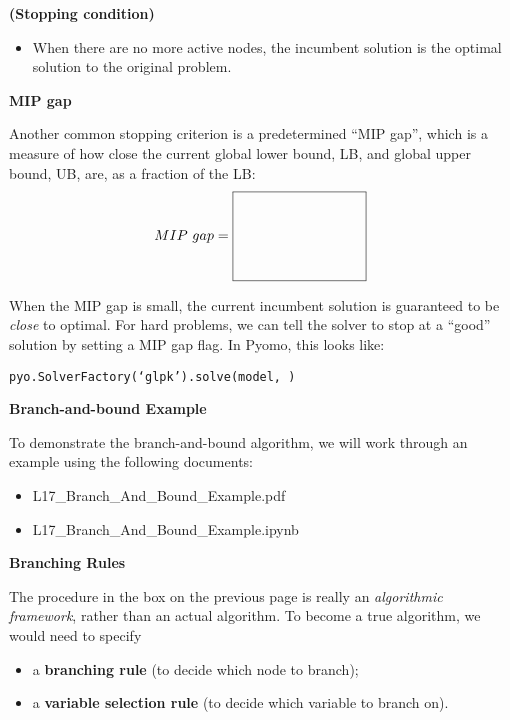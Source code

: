 \documentclass[11pt]{article}
\theoremstyle{definition}
\newcommand{\answerbox}[3]{%
  \fbox{%
    \begin{minipage}[#1]{#2}
      \hfill\vspace{#3}
    \end{minipage}
  }
}
\newcommand{\wordbox}{\answerbox{c}{1.2in}{.7cm}}
\begin{document}
\begin{tcolorbox}
\begin{itemize}
\begin{itemize}
\end{itemize}
\end{itemize}

\bigskip
\textbf{(Stopping condition)}
\begin{itemize}
\item When there are no more active nodes, the incumbent solution is the optimal solution to the original problem.
\end{itemize}
\end{tcolorbox}

\bigskip
\textbf{MIP gap}

Another common stopping criterion is a predetermined ``MIP gap'', which is a measure of how close the current global lower bound, LB, and global upper bound, UB, are, as a fraction of the LB:
\[
MIP~gap =   \answerbox{c}{3cm}{2cm} %
\]

When the MIP gap is small, the current incumbent solution is guaranteed to be \emph{close} to optimal.  For hard problems, we can tell the solver to stop at a ``good'' solution by setting a MIP gap flag.  In Pyomo, this looks like:
\begin{center}
\texttt{pyo.SolverFactory(`glpk').solve(model, \wordbox)} %
\end{center}

\newpage
\textbf{Branch-and-bound Example}  

To demonstrate the branch-and-bound algorithm, we will work through an example using the following  documents:

\begin{itemize}
\item  L17\_Branch\_And\_Bound\_Example.pdf
\item  L17\_Branch\_And\_Bound\_Example.ipynb
\end{itemize}


\bigskip

\textbf{Branching Rules}

The procedure in the box on the previous page is really an \emph{algorithmic framework}, rather than an actual algorithm. To become a true algorithm, we would need to specify
\begin{itemize}
\item a \textbf{branching rule} (to decide which \wordbox node to branch);
\item a \textbf{variable selection rule} (to decide which \wordbox variable to branch on).
\end{itemize}
\end{document}
